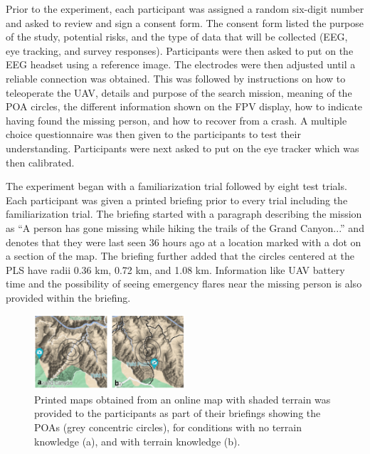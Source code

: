 \documentclass{article}
\begin{document}
	Prior to the experiment, each participant was assigned a random six-digit number and asked to review and sign a consent form. The consent form listed the purpose of the study, potential risks, and the type of data that will be collected (EEG, eye tracking, and survey responses). Participants were then asked to put on the EEG headset using a reference image. The electrodes were then adjusted until a reliable connection was obtained. This was followed by instructions on how to teleoperate the UAV, details and purpose of the search mission, meaning of the POA circles, the different information shown on the FPV display, how to indicate having found the missing person, and how to recover from a crash. A multiple choice questionnaire was then given to the participants to test their understanding. Participants were next asked to put on the eye tracker which was then calibrated.
	
	The experiment began with a familiarization trial followed by eight test trials. Each participant was given a printed briefing prior to every trial including the familiarization trial. The briefing started with a paragraph describing the mission as ``A person has gone missing while hiking the trails of the Grand Canyon...'' and denotes that they were last seen 36 hours ago at a location marked with a dot on a section of the map. The briefing further added that the circles centered at the PLS have radii 0.36 km, 0.72 km, and 1.08 km. Information like UAV battery time and the possibility of seeing emergency flares near the missing person is also provided within the briefing. 
	
	
	
	
	
	
	\begin{figure}[ht!]
		\centering
		\includegraphics[width=0.5\textwidth]{images/terrainKnowledge.png}
		\caption[width=0.5\textwidth]{Printed maps obtained from an online map with shaded terrain \cite{googlemaps} was provided to the participants as part of their briefings showing the POAs (grey concentric circles), for conditions with no terrain knowledge (a), and with terrain knowledge (b). }
		\label{fig:terrainKnowledge}
	\end{figure}
	
\end{document}
